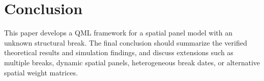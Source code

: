 \section{Conclusion}\label{sec:conclusion}

This paper develops a QML framework for a spatial panel model with an unknown structural break. The final conclusion should summarize the verified theoretical results and simulation findings, and discuss extensions such as multiple breaks, dynamic spatial panels, heterogeneous break dates, or alternative spatial weight matrices.


